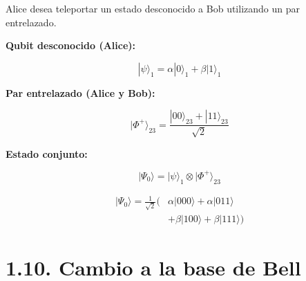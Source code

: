 \documentclass{afitdefense}
\begin{document}
\begin{Center}

\small
Alice desea teleportar un estado desconocido
a Bob utilizando un par entrelazado.

\vspace{0.5cm}

\begin{minipage}[c]{0.46\textwidth}
\centering
\small

\textbf{Qubit desconocido (Alice):}

\[
|\psi\rangle_1 =
\alpha|0\rangle_1+\beta|1\rangle_1
\]

\vspace{0.5cm}

\textbf{Par entrelazado (Alice y Bob):}

\[
|\Phi^+\rangle_{23} =
\frac{|00\rangle_{23}+|11\rangle_{23}}
{\sqrt{2}}
\]

\end{minipage}
\hfill
\begin{minipage}[c]{0.51\textwidth}
\centering
\small

\textbf{Estado conjunto:}

\[
|\Psi_0\rangle =
|\psi\rangle_1\otimes|\Phi^+\rangle_{23}
\]

\vspace{0.3cm}

\[
\boxed{
\begin{aligned}
|\Psi_0\rangle = \frac{1}{\sqrt{2}}\big(
&\alpha|000\rangle+\alpha|011\rangle\\
&+\beta|100\rangle+\beta|111\rangle
\big)
\end{aligned}
}
\]

\end{minipage}

\end{Center}


\section{1.10. Cambio a la base de Bell}
\end{document}
